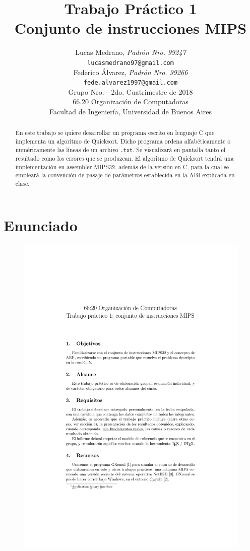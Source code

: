\documentclass[a4paper, 12pt]{article}
\title{		\textbf{Trabajo Práctico 1}\\
			\textbf{Conjunto de instrucciones MIPS}
			}
\author{	Lucas Medrano, \textit{Padrón Nro. 99247}                     	\\
            \texttt{ lucasmedrano97@gmail.com }                           		\\
            Federico Álvarez, \textit{Padrón Nro. 99266}                 	\\
            \texttt{ fede.alvarez1997@gmail.com }                                 	\\[2.5ex]
            \normalsize{Grupo Nro. \quad - 2do. Cuatrimestre de 2018}      	\\
            \normalsize{66.20 Organización de Computadoras}               	\\
            \normalsize{Facultad de Ingeniería, Universidad de Buenos Aires}\\
       }
\date{}
\begin{document}
	\lstset{inputencoding=utf8/latin1} %
	\maketitle
	\thispagestyle{empty}
	\begin{abstract}
		En este trabajo se quiere desarrollar un programa escrito en lenguaje C que implementa un algoritmo de Quicksort. Dicho programa ordena alfabéticamente o numéricamente las líneas de un archivo \texttt{.txt}. Se visualizará en pantalla tanto el resultado como los errores que se produzcan. El algoritmo de Quicksort tendrá una implementación en assembler MIPS32, además de la versión en C, para la cual se empleará la convención de pasaje de parámetros establecida en la ABI explicada en clase.
	\end{abstract}
	
	\pagebreak
	\thispagestyle{empty}
	\tableofcontents
	\newpage
	
	\setcounter{page}{1}
	
	\section{Enunciado}

	\begin{figure}[H]
		\centering
		\includegraphics[scale=1, page = 1, clip, trim=1.5in 36mm 20mm 35mm]{files/enunciado.pdf}
	\end{figure}
	
\end{document}
